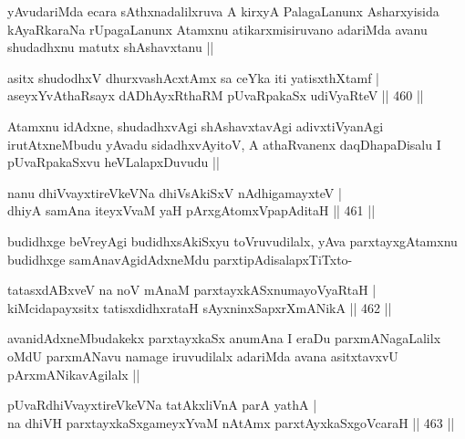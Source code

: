 \begin{artha}
yAvudariMda ecara sAthxnadalilxruva A kirxyA PalagaLanunx Asharxyisida kAyaRkaraNa rUpagaLanunx Atamxnu atikarxmisiruvano adariMda avanu shudadhxnu matutx shAshavxtanu ||
\end{artha}

\begin{shl}
asitx shudodhxV dhurxvashAcx\s \s tAmx sa ceYka iti yatisxthXtamf | \\
aseyxYvAthaRsayx dADhAyxRthaRM pUvaRpakaSx udiVyaRteV \hfill||  460 ||  
\end{shl}

\begin{artha}
Atamxnu idAdxne, shudadhxvAgi shAshavxtavAgi adivxtiVyanAgi irutAtxneMbudu yAvadu sidadhxvAyitoV, A athaRvanenx daqDhapaDisalu I pUvaRpakaSxvu heVLalapxDuvudu ||
\end{artha}


\begin{shl}
nanu dhiVvayxtireVkeVNa dhiVsAkiSxV nAdhigamayxteV | \\
dhiyA samAna iteyxVvaM yaH pArxgAtomxVpapAditaH \hfill||  461 ||  
\end{shl}

\begin{artha}
budidhxge beVreyAgi budidhxsAkiSxyu toVruvudilalx, yAva parxtayxgAtamxnu budidhxge samAnavAgidAdxneMdu parxtipAdisalapxTiTxto- 
\end{artha}

\begin{shl}
tatasxdABxveV na noV mAnaM parxtayxkASxnumayoVyaRtaH | \\
kiMcidapayxsitx tatisxdidhxrataH sAyxninxSapxrXmANikA \hfill||  462 ||  
\end{shl}

\begin{artha}
avanidAdxneMbudakekx parxtayxkaSx anumAna I eraDu parxmANagaLalilx oMdU parxmANavu namage iruvudilalx adariMda avana asitxtavxvU pArxmANikavAgilalx ||
\end{artha}


\begin{shl}
pUvaRdhiVvayxtireVkeVNa tatAkxliVnA parA yathA | \\
na dhiVH parxtayxkaSxgameyxYvaM nA\s \s tAmx parxtAyxkaSxgoVcaraH \hfill||  463 ||  
\end{shl}

